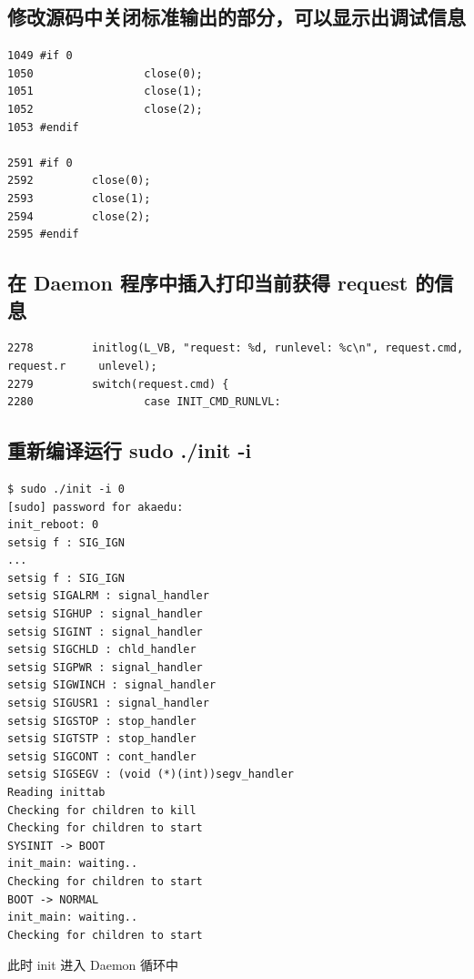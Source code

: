 \subsection{修改源码中关闭标准输出的部分，可以显示出调试信息}

{\begin{shaded}\begin{verbatim}
1049 #if 0
1050                 close(0);
1051                 close(1);
1052                 close(2);
1053 #endif

2591 #if 0
2592         close(0);
2593         close(1);
2594         close(2);
2595 #endif
\end{verbatim}\end{shaded}}
\subsection{在 Daemon 程序中插入打印当前获得 request 的信息}

{\begin{shaded}\begin{verbatim}
2278         initlog(L_VB, "request: %d, runlevel: %c\n", request.cmd, request.r     unlevel);
2279         switch(request.cmd) {
2280                 case INIT_CMD_RUNLVL:
\end{verbatim}\end{shaded}}
\subsection{重新编译运行 sudo ./init -i}

{\begin{shaded}\begin{verbatim}
$ sudo ./init -i 0
[sudo] password for akaedu: 
init_reboot: 0
setsig f : SIG_IGN  
...
setsig f : SIG_IGN  
setsig SIGALRM : signal_handler 
setsig SIGHUP : signal_handler  
setsig SIGINT : signal_handler  
setsig SIGCHLD : chld_handler   
setsig SIGPWR : signal_handler  
setsig SIGWINCH : signal_handler    
setsig SIGUSR1 : signal_handler 
setsig SIGSTOP : stop_handler   
setsig SIGTSTP : stop_handler   
setsig SIGCONT : cont_handler   
setsig SIGSEGV : (void (*)(int))segv_handler    
Reading inittab
Checking for children to kill
Checking for children to start
SYSINIT -> BOOT
init_main: waiting..
Checking for children to start
BOOT -> NORMAL
init_main: waiting..
Checking for children to start
\end{verbatim}\end{shaded}}
此时 init 进入 Daemon 循环中

